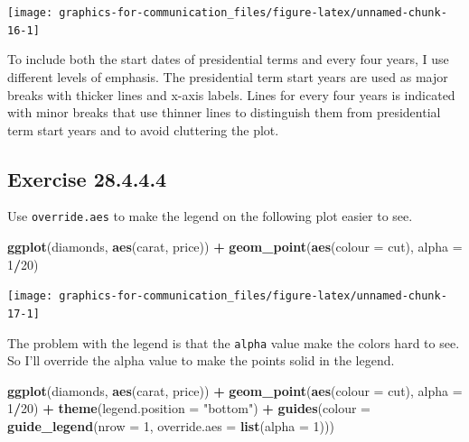 \documentclass[]{book}
\newenvironment{Shaded}{\begin{snugshade}}{\end{snugshade}}
\newcommand{\DataTypeTok}[1]{\textcolor[rgb]{0.13,0.29,0.53}{#1}}
\newcommand{\DecValTok}[1]{\textcolor[rgb]{0.00,0.00,0.81}{#1}}
\newcommand{\KeywordTok}[1]{\textcolor[rgb]{0.13,0.29,0.53}{\textbf{#1}}}
\newcommand{\NormalTok}[1]{#1}
\newcommand{\OperatorTok}[1]{\textcolor[rgb]{0.81,0.36,0.00}{\textbf{#1}}}
\newcommand{\StringTok}[1]{\textcolor[rgb]{0.31,0.60,0.02}{#1}}
\theoremstyle{plain}
\theoremstyle{remark}
\begin{document}
\begin{center}\texttt{[image: graphics-for-communication\_files/figure-latex/unnamed-chunk-16-1]} \end{center}

To include both the start dates of presidential terms and every
four years, I use different levels of emphasis.
The presidential term start years are used as major breaks with thicker lines and x-axis labels.
Lines for every four years is indicated with minor breaks that use thinner lines to distinguish them from presidential term start years and to avoid cluttering the plot.

\hypertarget{exercise-28.4.4.4}{%
\subsection*{\texorpdfstring{Exercise {28.4.4.4}}{Exercise 28.4.4.4}}\label{exercise-28.4.4.4}}

Use \texttt{override.aes} to make the legend on the following plot easier to see.

\begin{Shaded}
\begin{Highlighting}[]
\KeywordTok{ggplot}\NormalTok{(diamonds, }\KeywordTok{aes}\NormalTok{(carat, price)) }\OperatorTok{+}
\StringTok{  }\KeywordTok{geom_point}\NormalTok{(}\KeywordTok{aes}\NormalTok{(}\DataTypeTok{colour =}\NormalTok{ cut), }\DataTypeTok{alpha =} \DecValTok{1}\OperatorTok{/}\DecValTok{20}\NormalTok{)}
\end{Highlighting}
\end{Shaded}

\begin{center}\texttt{[image: graphics-for-communication\_files/figure-latex/unnamed-chunk-17-1]} \end{center}

The problem with the legend is that the \texttt{alpha} value make the colors hard to see. So I'll override the alpha value to make the points solid in the legend.

\begin{Shaded}
\begin{Highlighting}[]
\KeywordTok{ggplot}\NormalTok{(diamonds, }\KeywordTok{aes}\NormalTok{(carat, price)) }\OperatorTok{+}
\StringTok{  }\KeywordTok{geom_point}\NormalTok{(}\KeywordTok{aes}\NormalTok{(}\DataTypeTok{colour =}\NormalTok{ cut), }\DataTypeTok{alpha =} \DecValTok{1}\OperatorTok{/}\DecValTok{20}\NormalTok{)  }\OperatorTok{+}
\StringTok{  }\KeywordTok{theme}\NormalTok{(}\DataTypeTok{legend.position =} \StringTok{"bottom"}\NormalTok{) }\OperatorTok{+}
\StringTok{  }\KeywordTok{guides}\NormalTok{(}\DataTypeTok{colour =} \KeywordTok{guide_legend}\NormalTok{(}\DataTypeTok{nrow =} \DecValTok{1}\NormalTok{, }\DataTypeTok{override.aes =} \KeywordTok{list}\NormalTok{(}\DataTypeTok{alpha =} \DecValTok{1}\NormalTok{)))  }
\end{Highlighting}
\end{Shaded}
\end{document}

